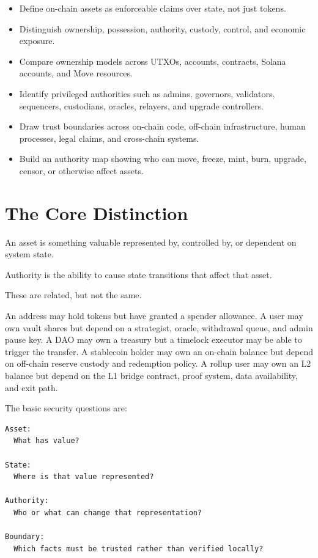 \begin{itemize}
\tightlist
\item
  Define on-chain assets as enforceable claims over state, not just
  tokens.
\item
  Distinguish ownership, possession, authority, custody, control, and
  economic exposure.
\item
  Compare ownership models across UTXOs, accounts, contracts, Solana
  accounts, and Move resources.
\item
  Identify privileged authorities such as admins, governors, validators,
  sequencers, custodians, oracles, relayers, and upgrade controllers.
\item
  Draw trust boundaries across on-chain code, off-chain infrastructure,
  human processes, legal claims, and cross-chain systems.
\item
  Build an authority map showing who can move, freeze, mint, burn,
  upgrade, censor, or otherwise affect assets.
\end{itemize}

\section{The Core Distinction}

An asset is something valuable represented by, controlled by, or
dependent on system state.

Authority is the ability to cause state transitions that affect that
asset.

These are related, but not the same.

An address may hold tokens but have granted a spender allowance. A user
may own vault shares but depend on a strategist, oracle, withdrawal
queue, and admin pause key. A DAO may own a treasury but a timelock
executor may be able to trigger the transfer. A stablecoin holder may
own an on-chain balance but depend on off-chain reserve custody and
redemption policy. A rollup user may own an L2 balance but depend on the
L1 bridge contract, proof system, data availability, and exit path.

The basic security questions are:

\begin{lstlisting}
Asset:
  What has value?

State:
  Where is that value represented?

Authority:
  Who or what can change that representation?

Boundary:
  Which facts must be trusted rather than verified locally?
\end{lstlisting}

